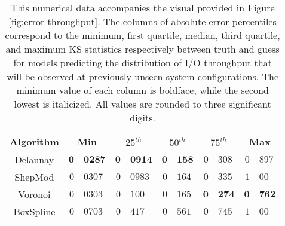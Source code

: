 \documentclass[doublespace,nopageskip]{VTthesis} %
\begin{document}
\begin{appendices}
  \begin{table}
    \centering
    \begin{tabular}{c|r@{.}l|r@{.}l|r@{.}l|r@{.}l|r@{.}l}
      \hline
      Algorithm & \multicolumn{2}{c|}{Min} & \multicolumn{2}{c|}{$25^{th}$} & \multicolumn{2}{c|}{$50^{th}$} & \multicolumn{2}{c|}{$75^{th}$} & \multicolumn{2}{c}{Max}\\
      \hline
      Delaunay & $\mathbf{0}$&$\mathbf{0287}$ & $\mathbf{0}$&$\mathbf{0914}$ & $\mathbf{0}$&$\mathbf{158}$ & $\mathit{0}$&$\mathit{308}$ & $\mathit{0}$&$\mathit{897}$\\
      ShepMod & $0$&$0307$ & $\mathit{0}$&$\mathit{0983}$ & $\mathit{0}$&$\mathit{164}$ & $0$&$335$ & $1$&$00$\\
      Voronoi & $\mathit{0}$&$\mathit{0303}$ & $0$&$100$ & $0$&$165$ & $\mathbf{0}$&$\mathbf{274}$ & $\mathbf{0}$&$\mathbf{762}$\\
      BoxSpline & $0$&$0703$ & $0$&$417$ & $0$&$561$ & $0$&$745$ & $1$&$00$\\
      \hline
    \end{tabular}
    \caption{This numerical data accompanies the visual provided in
      Figure \ref{fig:error-throughput}. The columns of absolute error
      percentiles correspond to the minimum, first quartile, median,
      third quartile, and maximum KS statistics respectively between
      truth and guess for models predicting the distribution of I/O
      throughput that will be observed at previously unseen system
      configurations. The minimum value of each column is boldface,
      while the second lowest is italicized. All values are rounded to
      three significant digits.}
    \label{table:error-throughput}
  \end{table}


\end{appendices}
\end{document}
